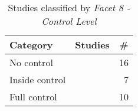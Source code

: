 
\begin{table}
	\centering
   
	\caption {Studies classified by \it Facet 8 - Control Level}
		\begin{tabular}{l|p{2.0in}|r}
			\bf Category & \bf Studies & \bf \#  \\
			\hline
			No control & \citep{id5343, id5357, id4663, id4815, id5676, id17805, id17830, id17845, id5335, id5546, id0098, id1192, id1193, id4966, id5147, id5328} & 16 \\ 
			Inside control & \citep{id17882, id17796, id0093, id18433, id0089, id0106, id1097} & 7 \\
			Full control & \citep{id0135, id5353, id1088, id4503, id4811, id5329, id0115, id17800, id0134, id18359} & 10 \\ 
		\end{tabular} \label{tab:controlLevelStudies}
\end{table}

